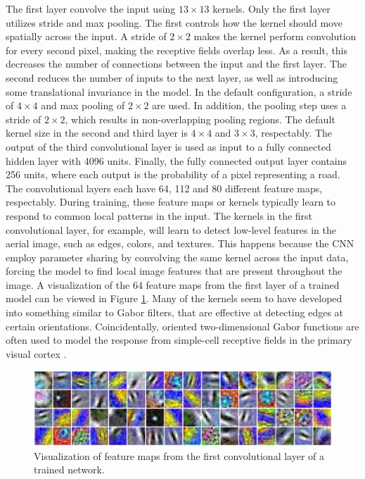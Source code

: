 The first layer convolve  the input using $13 \times 13$ kernels. Only the first layer utilizes stride and max pooling. The first controls how the kernel should move spatially across the input. A stride of $2 \times 2$ makes the kernel perform convolution for every second pixel, making the receptive fields overlap less. As a result, this decreases the number of connections between the input and the first layer. The second reduces the number of inputs to the next layer, as well as introducing some translational invariance in the model. In the default configuration, a stride of $4 \times 4$ and max pooling of $2 \times 2$ are used. In addition, the pooling step uses a stride of $2 \times 2$, which results in non-overlapping pooling regions. The default kernel size in the second and third layer is $4 \times 4$ and $3 \times 3$, respectably. The output of the third convolutional layer is used as input to a fully connected hidden layer with 4096 units. Finally, the fully connected output layer contains 256 units, where each output is the probability of a pixel representing a road.\\


The convolutional layers each have 64, 112 and 80 different feature maps, respectably. During training, these feature maps or kernels typically learn to respond to common local patterns in the input. The kernels in the first convolutional layer, for example, will learn to detect low-level features in the aerial image, such as edges, colors, and textures. This happens because the \ac{CNN} employ parameter sharing by convolving the same kernel across the input data, forcing the model to find local image features that are present throughout the image. A visualization of the 64 feature maps from the first layer of a trained model can be viewed in Figure \ref{fig:convoluional_first_layer_visualization}. Many of the kernels seem to have developed into something similar to Gabor filters, that are effective at detecting edges at certain orientations. Coincidentally, oriented two-dimensional Gabor functions are often used to model the response from simple-cell receptive fields in the primary visual cortex \citep{Ringach_gabor_spatial}. \\


\begin{figure}
\begin{center}
\includegraphics[width=1\columnwidth]{figs/network/Filter_unblurred.png}
\caption[Visualization of filter map]{Visualization of feature maps from the first convolutional layer of a trained network.}
\label{fig:convoluional_first_layer_visualization}
\end{center}
\end{figure}

